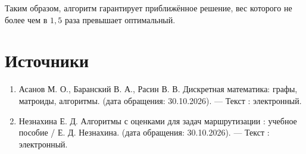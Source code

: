 \documentclass[12pt,a4paper]{article}
\begin{document}
Таким образом, алгоритм гарантирует
приближённое решение, вес которого
не более чем в $1{,}5$ раза превышает
оптимальный.

\section*{Источники}

\begin{enumerate}[leftmargin=*,itemsep=2pt]

    \item Асанов М. О., Баранский В. А., Расин В. В.
    Дискретная математика: графы, матроиды, алгоритмы.
    (дата обращения: 30.10.2026).
    --- Текст : электронный.

    \item Незнахина Е. Д.
    Алгоритмы с оценками для задач маршрутизации :
    учебное пособие / Е. Д. Незнахина.
    (дата обращения: 30.10.2026).
    --- Текст : электронный.

\end{enumerate}
\end{document}
